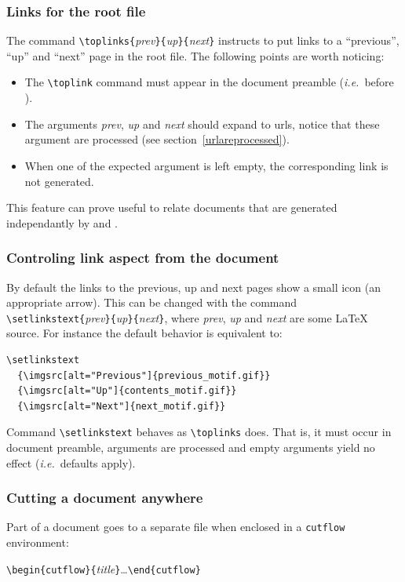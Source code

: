 \subsubsection{Links for the root file}
The command \verb+\toplinks{+\textit{prev}\verb+}{+\textit{up}\verb+}{+\textit{next}\verb+}+ instructs \hacha{}  to put links to a
``previous'', ``up'' and ``next'' page in the root file.
The following points are worth noticing:
\begin{itemize}
\item The \verb+\toplink+ command must appear in the document preamble
(\emph{i.e.}\ before \verb++).
\item The arguments
\textit{prev}, \textit{up} and \textit{next} should expand to urls,
notice that these argument are processed (see section~\ref{urlareprocessed}).
\item When one of the expected argument is left empty,
the corresponding link is not generated.
\end{itemize}
This feature can prove useful to
relate documents that are generated independantly by
\hevea{} and \hacha{}.

\subsubsection{Controling link aspect from the document}
%
By default the links to the previous, up and next pages show a small
icon (an appropriate arrow). This can be changed with the command
\verb+\setlinkstext{+\textit{prev}\verb+}{+\textit{up}\verb+}{+\textit{next}\verb+}+,
where \textit{prev}, \textit{up} and \textit{next} are some \LaTeX{}
source.
For instance the default behavior is equivalent to:
\begin{verbatim}
\setlinkstext
  {\imgsrc[alt="Previous"]{previous_motif.gif}}
  {\imgsrc[alt="Up"]{contents_motif.gif}}
  {\imgsrc[alt="Next"]{next_motif.gif}}
\end{verbatim}
Command \verb+\setlinkstext+ behaves as \verb+\toplinks+ does.
That is, it must occur in document preamble, arguments are processed
and empty arguments yield no effect (\emph{i.e.}\ defaults apply).

\subsubsection{Cutting a document anywhere}
Part of a document goes to a separate file when enclosed in a
\verb+cutflow+ environment:
\begin{flushleft}
  \verb+\begin{cutflow}{+\textit{title}\verb+}+\ldots\verb+\end{cutflow}+
\end{flushleft}

